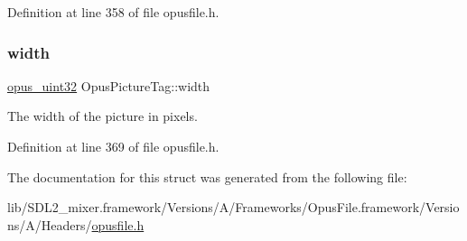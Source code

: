 Definition at line 358 of file opusfile.\+h.

\mbox{\label{struct_opus_picture_tag_a805d4de3372bac983cadbd916350ddd6}} 
\subsubsection{\texorpdfstring{width}{width}}
{\footnotesize\ttfamily \mbox{\hyperlink{opus__types_8h_a643eaaadb9ef6cd44308e0299d8cd8ce}{opus\+\_\+uint32}} Opus\+Picture\+Tag\+::width}

The width of the picture in pixels. 

Definition at line 369 of file opusfile.\+h.



The documentation for this struct was generated from the following file\+:\begin{DoxyCompactItemize}
\item 
lib/\+S\+D\+L2\+\_\+mixer.\+framework/\+Versions/\+A/\+Frameworks/\+Opus\+File.\+framework/\+Versions/\+A/\+Headers/\mbox{\hyperlink{opusfile_8h}{opusfile.\+h}}\end{DoxyCompactItemize}
